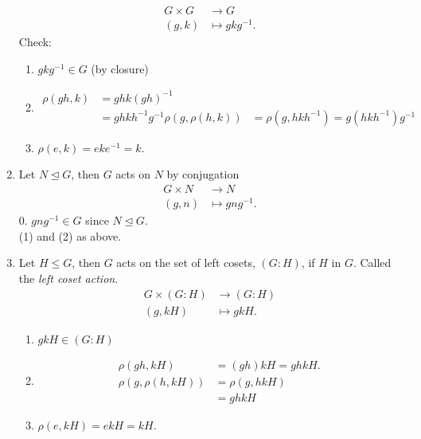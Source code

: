 \begin{example}
\begin{enumerate}
        \begin{align*}
            G \times G &\to G \\
            (g, k) &\mapsto gkg^{-1}.
        \end{align*} 
        Check: 
        \begin{enumerate} \addtocounter{enumii}{-1}
            \item $gkg^{-1} \in G$ (by closure)
            \item
            \begin{align*}
                \rho(gh, k) &= ghk(gh)^{-1} \\
                &= gh k h^{-1} g^{-1}
                \rho(g, \rho(h, k)) &= \rho(g, hkh^{-1}) = g (h k h^{-1}) g^{-1}
            \end{align*} 
            \item $\rho(e, k) = ek e^{-1} = k$.
        \end{enumerate} 
        \item Let $N \trianglelefteq G$, then $G$ acts on $N$ by conjugation
        \begin{align*}
            G \times N &\to N \\
            (g, n) &\mapsto gng^{-1}.
        \end{align*} 
        0.  $gng^{-1} \in G$ since $N \trianglelefteq G$. \\
        (1) and (2) as above.
        \item Let $H \leq G$, then $G$ acts on the set of left cosets, $(G : H)$, if $H$ in $G$.
        Called the \emph{left coset action}.
        \begin{align*}
            G \times (G : H) &\to (G : H) \\
            (g, kH) &\mapsto gkH.
        \end{align*} 
        \begin{enumerate} \addtocounter{enumii}{-1}
            \item $gkH \in (G : H)$
            \item
            \begin{align*}
                \rho(gh, kH) &= (gh)kH = gh kH. \\
                \rho(g, \rho(h, kH)) &= \rho(g, hkH) \\
                &= g h k H
            \end{align*} 
            \item $\rho(e, kH) = ek H = kH$.
        \end{enumerate} 
    \end{enumerate} 
\end{example} 

